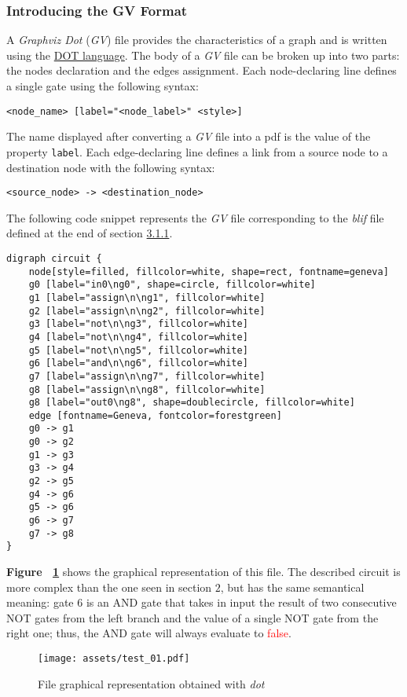\documentclass[]{usiinfbachelorproject}
\begin{document}
\subsubsection{Introducing the GV Format}\label{subsubsec:gv-format}
A \textit{Graphviz Dot} (\textit{GV}) file \cite{gv} provides the characteristics of a graph and is written using the \href{https://graphviz.org/doc/info/lang.html}{DOT language}. The body of a \textit{GV} file can be broken up into two parts: the nodes declaration and the edges assignment. Each node-declaring line defines a single gate using the following syntax:
\begin{center}
    \texttt{<node\_name> [label="<node\_label>" <style>]}
\end{center}
The name displayed after converting a \textit{GV} file into a pdf is the value of the property \texttt{label}.
Each edge-declaring line defines a link from a source node to a destination node with the following syntax:
\begin{center}
    \texttt{<source\_node> -> <destination\_node>}
\end{center}
The following code snippet represents the \textit{GV} file corresponding to the \textit{blif} file defined at the end of section \hyperref[subsubsec:blif-format]{3.1.1}.
\begin{verbatim}
digraph circuit {
    node[style=filled, fillcolor=white, shape=rect, fontname=geneva]
    g0 [label="in0\ng0", shape=circle, fillcolor=white]
    g1 [label="assign\n\ng1", fillcolor=white]
    g2 [label="assign\n\ng2", fillcolor=white]
    g3 [label="not\n\ng3", fillcolor=white]
    g4 [label="not\n\ng4", fillcolor=white]
    g5 [label="not\n\ng5", fillcolor=white]
    g6 [label="and\n\ng6", fillcolor=white]
    g7 [label="assign\n\ng7", fillcolor=white]
    g8 [label="assign\n\ng8", fillcolor=white]
    g8 [label="out0\ng8", shape=doublecircle, fillcolor=white]
    edge [fontname=Geneva, fontcolor=forestgreen]
    g0 -> g1
    g0 -> g2
    g1 -> g3
    g3 -> g4
    g2 -> g5
    g4 -> g6
    g5 -> g6
    g6 -> g7
    g7 -> g8
}
\end{verbatim}
\textbf{Figure ~\ref{fig:simple-pdf}} shows the graphical representation of this file. The described circuit is more complex than the one seen in section $2$, but has the same semantical meaning: gate $6$ is an AND gate that takes in input the result of two consecutive NOT gates from the left branch and the value of a single NOT gate from the right one; thus, the AND gate will always evaluate to \textcolor{red}{false}.
\begin{figure}[H]
    \centering
    \texttt{[image: assets/test\_01.pdf]}
    \caption{File graphical representation obtained with \textit{dot}}
    \label{fig:simple-pdf}
\end{figure}
\end{document}
